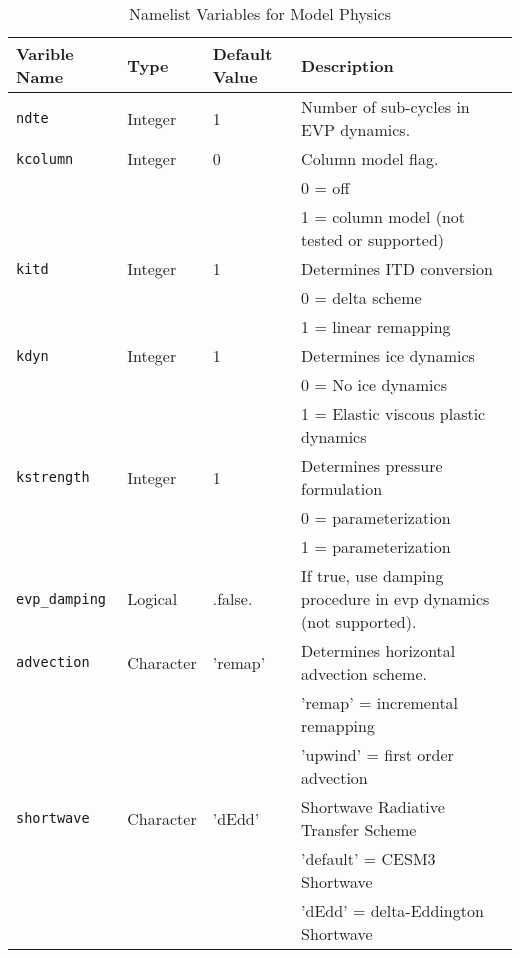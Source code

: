 \begin{table}
  \begin{center}
  \caption{Namelist Variables for Model Physics}
  \label{ice_nml}
  \begin{tabular}{p{3cm}p{2.0cm}p{3cm}p{6.5cm}} \hline
  Varible Name & Type & Default Value & Description               \\
\hline \hline

{\tt ndte} & Integer & 1 & Number of sub-cycles in EVP dynamics. \\

{\tt kcolumn} &  Integer & 0 & Column model flag. \\
        &          &   & 0 = off \\
        &          &   & 1 = column model (not tested or supported)\\

{\tt kitd} &  Integer & 1 & Determines ITD conversion \\
     &          &   & 0 = delta scheme \\
     &          &   & 1 = linear remapping \\

{\tt kdyn} &  Integer & 1 & Determines ice dynamics \\
     &          &   & 0 = No ice dynamics\\
     &          &   & 1 = Elastic viscous plastic dynamics\\

{\tt kstrength} &  Integer & 1 &  Determines pressure formulation \\
          &          &   &  0 = \cite{hibl79} parameterization \\
          &          &   &  1 = \cite{roth75b} parameterization \\

{\tt evp\_damping} &  Logical & .false. & If true, use damping procedure
                                             in evp dynamics (not supported). \\

{\tt advection} &  Character & 'remap' &  Determines horizontal
                                               advection scheme. \\
          &            &   &  'remap' = incremental remapping \\
          &            &   &   'upwind' = first order advection \\

{\tt shortwave} & Character & 'dEdd' & Shortwave Radiative Transfer Scheme \\
                &           &        & 'default' = CESM3 Shortwave \\
                &           &        & 'dEdd' = delta-Eddington Shortwave \\


\end{tabular}
\end{center}
\end{table}
